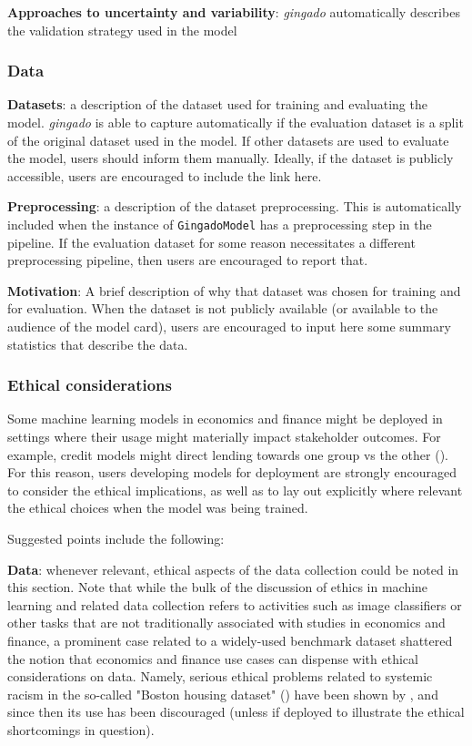 \documentclass{article}
\begin{document}
\textbf{Approaches to uncertainty and variability}: \textit{gingado} automatically describes the validation strategy used in the model

\subsubsection{Data}

\textbf{Datasets}: a description of the dataset used for training and evaluating the model. \textit{gingado} is able to capture automatically if the evaluation dataset is a split of the original dataset used in the model. If other datasets are used to evaluate the model, users should inform them manually. Ideally, if the dataset is publicly accessible, users are encouraged to include the link here.

\textbf{Preprocessing}: a description of the dataset preprocessing. This is automatically included when the instance of \texttt{GingadoModel} has a preprocessing step in the pipeline. If the evaluation dataset for some reason necessitates a different preprocessing pipeline, then users are encouraged to report that.

\textbf{Motivation}: A brief description of why that dataset was chosen for training and for evaluation. When the dataset is not publicly available (or available to the audience of the model card), users are encouraged to input here some summary statistics that describe the data.

\subsubsection{Ethical considerations}

Some machine learning models in economics and finance might be deployed in settings where their usage might materially impact stakeholder outcomes. For example, credit models might direct lending towards one group vs the other (\cite{predunequal}). For this reason, users developing models for deployment are strongly encouraged to consider the ethical implications, as well as to lay out explicitly where relevant the ethical choices when the model was being trained.

Suggested points include the following:

\textbf{Data}: whenever relevant, ethical aspects of the data collection could be noted in this section. Note that while the bulk of the discussion of ethics in machine learning and related data collection refers to activities such as image classifiers or other tasks that are not traditionally associated with studies in economics and finance, a prominent case related to a widely-used benchmark dataset shattered the notion that economics and finance use cases can dispense with ethical considerations on data. Namely, serious ethical problems related to systemic racism in the so-called "Boston housing dataset" (\cite{Boston}) have been shown by \cite{BostonHousingEthicsProblem}, and since then its use has been discouraged (unless if deployed to illustrate the ethical shortcomings in question).
\end{document}
